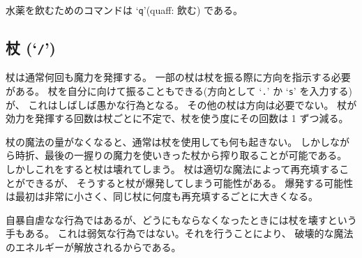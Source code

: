 水薬を飲むためのコマンドは `{\tt q}'(quaff: 飲む) である。

\subsection*{杖 (`{\tt /}')}

杖は通常何回も魔力を発揮する。
一部の杖は杖を振る際に方向を指示する必要がある。
杖を自分に向けて振ることもできる(方向として `{\tt .}' か `{\tt s}' を入力する)が、
これはしばしば愚かな行為となる。
その他の杖は方向は必要でない。
杖が効力を発揮する回数は杖ごとに不定で、杖を使う度にその回数は 1 ずつ減る。

杖の魔法の量がなくなると、通常は杖を使用しても何も起きない。
しかしながら時折、最後の一握りの魔力を使いきった杖から搾り取ることが可能である。
しかしこれをすると杖は壊れてしまう。
杖は適切な魔法によって再充填することができるが、
そうすると杖が爆発してしまう可能性がある。
爆発する可能性は最初は非常に小さく、同じ杖に何度も再充填するごとに大きくなる。

自暴自虐なな行為ではあるが、どうにもならなくなったときには杖を壊すという手もある。
これは弱気な行為ではない。それを行うことにより、
破壊的な魔法のエネルギーが解放されるからである。


